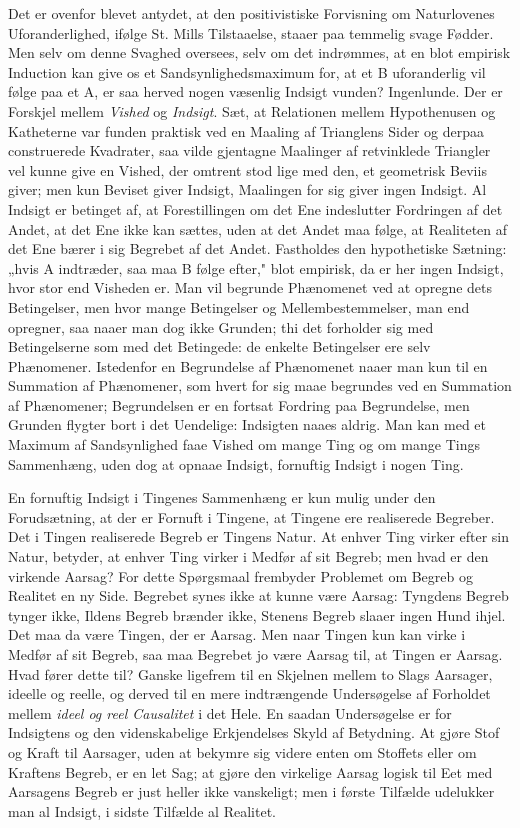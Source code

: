 \documentclass[12pt]{article}
\newcommand{\opage}[1]{\marginnote{\footnotesize\textit{[#1]}}}
\begin{document}
Det er ovenfor blevet antydet, at den positivistiske Forvisning om
Naturlovenes Uforanderlighed, ifølge St. Mills Tilstaaelse, staaer
paa temmelig svage Fødder. Men selv om denne Svaghed oversees, selv
om det indrømmes, at en blot empirisk Induction kan give os et
Sandsynlighedsmaximum for, at et B uforanderlig vil følge paa et A,
er saa herved nogen væsenlig Indsigt vunden? Ingenlunde. Der er
Forskjel mellem \emph{Vished} og \emph{Indsigt}. Sæt, at Relationen
mellem Hypothenusen og Katheterne var funden praktisk ved en Maaling
af Trianglens Sider og derpaa construerede Kvadrater, saa vilde
gjentagne Maalinger af retvinklede Triangler vel kunne give en
Vished, der omtrent stod lige med den, et geometrisk Beviis giver;
men kun Beviset giver Indsigt, Maalingen for sig giver ingen Indsigt.
Al Indsigt er betinget af, at Forestillingen om det Ene indeslutter
Fordringen af det Andet, at det Ene ikke kan sættes, uden at det
Andet maa følge, at Realiteten af det Ene bærer i sig Begrebet af
det Andet. Fastholdes den hypothetiske Sætning: „hvis A indtræder,
saa maa B følge efter," blot empirisk, da er her ingen Indsigt,
hvor stor end Visheden er. Man vil begrunde Phænomenet ved at
opregne dets Betingelser, men hvor mange Betingelser og
Mellembestemmelser, man end opregner, saa naaer man dog ikke
Grunden; thi det forholder sig med Betingelserne som med det
Betingede: de enkelte Betingelser ere selv Phænomener. Istedenfor
en Begrundelse af
\opage{44} Phænomenet naaer man kun til en Summation af Phænomener, som hvert
for sig maae begrundes ved en Summation af Phænomener; Begrundelsen
er en fortsat Fordring paa Begrundelse, men Grunden flygter bort i
det Uendelige: Indsigten naaes aldrig. Man kan med et Maximum af
Sandsynlighed faae Vished om mange Ting og om mange Tings
Sammenhæng, uden dog at opnaae Indsigt, fornuftig Indsigt i nogen
Ting.

En fornuftig Indsigt i Tingenes Sammenhæng er kun mulig under den
Forudsætning, at der er Fornuft i Tingene, at Tingene ere
realiserede Begreber. Det i Tingen realiserede Begreb er Tingens
Natur. At enhver Ting virker efter sin Natur, betyder, at enhver
Ting virker i Medfør af sit Begreb; men hvad er den virkende Aarsag?
For dette Spørgsmaal frembyder Problemet om Begreb og Realitet en ny
Side. Begrebet synes ikke at kunne være Aarsag: Tyngdens Begreb
tynger ikke, Ildens Begreb brænder ikke, Stenens Begreb slaaer ingen
Hund ihjel. Det maa da være Tingen, der er Aarsag. Men naar Tingen
kun kan virke i Medfør af sit Begreb, saa maa Begrebet jo være
Aarsag til, at Tingen er Aarsag. Hvad fører dette til? Ganske
ligefrem til en Skjelnen mellem to Slags Aarsager, ideelle og
reelle, og derved til en mere indtrængende Undersøgelse af Forholdet
mellem \emph{ideel og reel Causalitet} i det Hele. En saadan
Undersøgelse er for Indsigtens og den videnskabelige Erkjendelses
Skyld af Betydning. At gjøre Stof og Kraft til Aarsager, uden at
bekymre sig videre enten om Stoffets eller om Kraftens Begreb, er en
let Sag; at gjøre den virkelige Aarsag logisk til Eet med Aarsagens
Begreb er just heller ikke vanskeligt; men i første Tilfælde
udelukker man al Indsigt, i sidste Tilfælde al Realitet.
\end{document}
